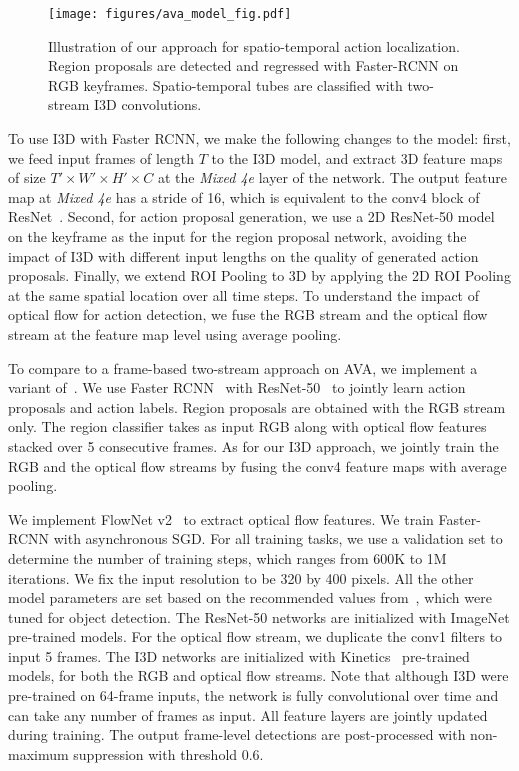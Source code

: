 \documentclass[10pt,twocolumn,letterpaper]{article}
\begin{document}
\begin{figure}[b]
\vspace{-2em}
\centering
\texttt{[image: figures/ava\_model\_fig.pdf]}
\caption{Illustration of our approach for spatio-temporal action localization. Region proposals are detected and regressed with Faster-RCNN on RGB keyframes. Spatio-temporal tubes are classified with two-stream I3D convolutions. 
}
\label{fig:model_figure}
\end{figure}

To use I3D with Faster RCNN, we make the following changes to the model: first, we feed input frames of length $T$ to the I3D model, and extract 3D feature maps of size $T' \times W' \times H' \times C$ at the \textit{Mixed 4e} layer of the network. The output feature map at \textit{Mixed 4e} has a stride of 16, which is equivalent to the conv4 block of ResNet~\cite{he2016resnet}. Second, for action proposal generation, we use a 2D ResNet-50 model on the keyframe as the input for the region proposal network, avoiding the impact of I3D with different input lengths on the quality of generated action proposals. Finally, we extend ROI Pooling to 3D by applying the 2D ROI Pooling at the same spatial location over all time steps. To understand the impact of optical flow for action detection, we fuse the RGB stream and the optical flow stream at the feature map level using average pooling.

To compare to a frame-based two-stream approach on AVA, we implement a variant of~\cite{peng2016multi}. We  use Faster RCNN~\cite{ren2015faster} with ResNet-50~\cite{he2016resnet} to jointly learn action proposals and action labels. Region proposals are obtained with the RGB stream only. 
The region classifier takes as input RGB along with optical flow features stacked over 5 consecutive frames. As for our I3D approach, we jointly train the RGB and the optical flow streams by fusing the conv4 feature maps with average pooling.  

 We implement FlowNet v2~\cite{flownet2} to extract optical flow features.  We train Faster-RCNN with asynchronous SGD. For all training tasks, we use a validation set to determine the number of training steps, which ranges from 600K to 1M iterations. We fix the input resolution to be 320 by 400 pixels. All the other model parameters are set based on the recommended values from~\cite{huang2016coco}, which were tuned for object detection. The ResNet-50 networks are initialized with ImageNet pre-trained models. For the optical flow stream, we duplicate the conv1 filters to input 5 frames. The I3D networks are initialized with Kinetics~\cite{kinetics17} pre-trained models, for both the RGB and optical flow streams. Note that although I3D were pre-trained on 64-frame inputs, the network is fully convolutional over time and can take any number of frames as input. All feature layers are jointly updated during training. The output frame-level detections are post-processed with non-maximum suppression with threshold 0.6.
\end{document}
